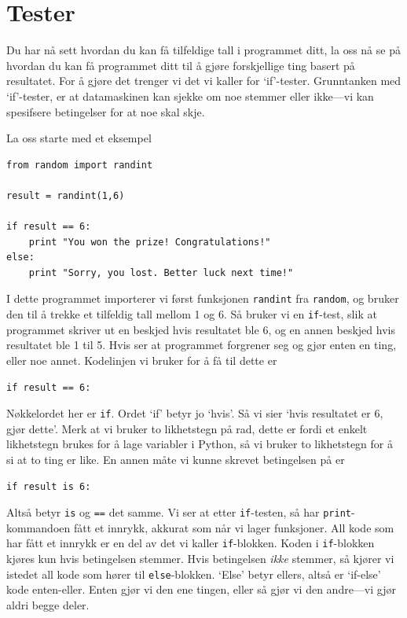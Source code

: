 \documentclass[a4paper, 11pt, notitlepage]{article}
\begin{document}
\clearpage

\section*{Tester}

Du har nå sett hvordan du kan få tilfeldige tall i programmet ditt, la oss nå se på hvordan du kan få programmet ditt til å gjøre forskjellige ting basert på resultatet. For å gjøre det trenger vi det vi kaller for `if'-tester. Grunntanken med `if'-tester, er at datamaskinen kan sjekke om noe stemmer eller ikke---vi kan spesifsere betingelser for at noe skal skje.

La oss starte med et eksempel
\begin{lstlisting}
from random import randint

result = randint(1,6)

if result == 6:
	print "You won the prize! Congratulations!"
else:
	print "Sorry, you lost. Better luck next time!"
\end{lstlisting}
I dette programmet importerer vi først funksjonen \verb+randint+ fra \verb+random+, og bruker den til å trekke et tilfeldig tall mellom 1 og 6. Så bruker vi en \verb+if+-test, slik at programmet skriver ut en beskjed hvis resultatet ble 6, og en annen beskjed hvis resultatet ble 1 til 5. Hvis ser at programmet forgrener seg og gjør enten en ting, eller noe annet. Kodelinjen vi bruker for å få til dette er
\begin{lstlisting}
if result == 6:
\end{lstlisting}
Nøkkelordet her er \verb+if+. Ordet `if' betyr jo `hvis'. Så vi sier `hvis resultatet er 6, gjør dette'. Merk at vi bruker to likhetstegn på rad, dette er fordi et enkelt likhetstegn brukes for å lage variabler i Python, så vi bruker to likhetstegn for å si at to ting er like. En annen måte vi kunne skrevet betingelsen på er
\begin{lstlisting}
if result is 6:
\end{lstlisting}
Altså betyr \verb+is+ og \verb+==+ det samme. Vi ser at etter \verb+if+-testen, så har \verb+print+-kommandoen fått et innrykk, akkurat som når vi lager funksjoner. All kode som har fått et innrykk er en del av det vi kaller \verb+if+-blokken. Koden i \verb+if+-blokken kjøres kun hvis betingelsen stemmer. Hvis betingelsen \emph{ikke} stemmer, så kjører vi istedet all kode som hører til \verb+else+-blokken. `Else' betyr ellers, altså er `if-else' kode enten-eller. Enten gjør vi den ene tingen, eller så gjør vi den andre---vi gjør aldri begge deler.
\end{document}

